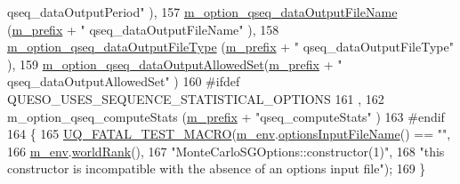\begin{DoxyCode}
{      qseq\_dataOutputPeriod"}      ),
157   \hyperlink{class_q_u_e_s_o_1_1_monte_carlo_s_g_options_a30620452f8188a0b4a0519bed24e64d1}{m\_option\_qseq\_dataOutputFileName}  (\hyperlink{class_q_u_e_s_o_1_1_monte_carlo_s_g_options_ac640fa60af7134d4113e9b7481a34f6c}{m\_prefix} + \textcolor{stringliteral}{"
      qseq\_dataOutputFileName"}    ),
158   \hyperlink{class_q_u_e_s_o_1_1_monte_carlo_s_g_options_a7e07046865a2e99b61ac30b94dfc8306}{m\_option\_qseq\_dataOutputFileType}  (\hyperlink{class_q_u_e_s_o_1_1_monte_carlo_s_g_options_ac640fa60af7134d4113e9b7481a34f6c}{m\_prefix} + \textcolor{stringliteral}{"
      qseq\_dataOutputFileType"}    ),
159   \hyperlink{class_q_u_e_s_o_1_1_monte_carlo_s_g_options_a2d464d948dabe4fd9fbd1e912537b3e0}{m\_option\_qseq\_dataOutputAllowedSet}(\hyperlink{class_q_u_e_s_o_1_1_monte_carlo_s_g_options_ac640fa60af7134d4113e9b7481a34f6c}{m\_prefix} + \textcolor{stringliteral}{"
      qseq\_dataOutputAllowedSet"}  )
160 \textcolor{preprocessor}{#ifdef QUESO\_USES\_SEQUENCE\_STATISTICAL\_OPTIONS}
161 \textcolor{preprocessor}{}  ,
162   m\_option\_qseq\_computeStats        (\hyperlink{class_q_u_e_s_o_1_1_monte_carlo_s_g_options_ac640fa60af7134d4113e9b7481a34f6c}{m\_prefix} + \textcolor{stringliteral}{"qseq\_computeStats"}          )
163 \textcolor{preprocessor}{#endif}
164 \textcolor{preprocessor}{}\{
165   \hyperlink{_defines_8h_a56d63d18d0a6d45757de47fcc06f574d}{UQ\_FATAL\_TEST\_MACRO}(\hyperlink{class_q_u_e_s_o_1_1_monte_carlo_s_g_options_a16b93142f6a249ccf1d07de964fec2ef}{m\_env}.\hyperlink{class_q_u_e_s_o_1_1_base_environment_aa0e3ccfe00e6f51dbe6dd6b9b6f65183}{optionsInputFileName}() == \textcolor{stringliteral}{""},
166                       \hyperlink{class_q_u_e_s_o_1_1_monte_carlo_s_g_options_a16b93142f6a249ccf1d07de964fec2ef}{m\_env}.\hyperlink{class_q_u_e_s_o_1_1_base_environment_a78b57112bbd0e6dd0e8afec00b40ffa7}{worldRank}(),
167                       \textcolor{stringliteral}{"MonteCarloSGOptions::constructor(1)"},
168                       \textcolor{stringliteral}{"this constructor is incompatible with the absence of an options input file"});
169 \}
\end{DoxyCode}
